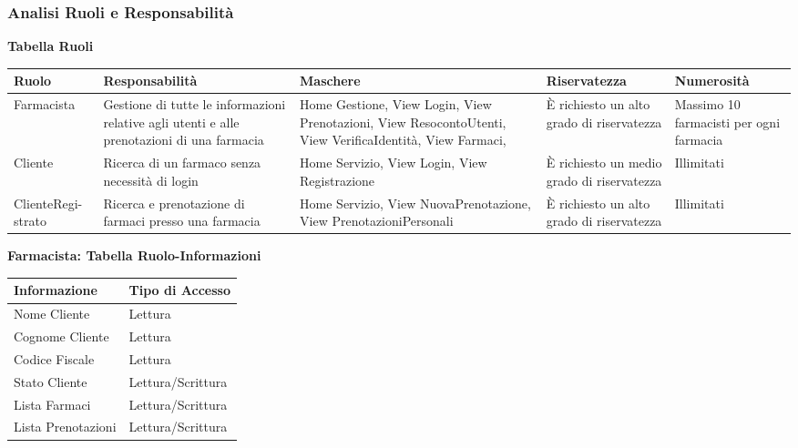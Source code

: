 \newpage
\subsubsection{Analisi Ruoli e Responsabilità}
\hfill \break

\textbf{Tabella Ruoli}
\hfill \break

\begin{tabular} {|P{2.5cm}|P{3cm}|P{3.5cm}|P{3cm}|P{3cm}|}
    \hline
    \textbf{Ruolo} & \textbf{Responsabilità} & \textbf{Maschere} & \textbf{Riservatezza} & \textbf{Numerosità} \\
    \hline
    Farmacista & Gestione di tutte le informazioni relative agli utenti e alle prenotazioni di una farmacia & Home Gestione, View Login, View Prenotazioni, View ResocontoUtenti, View VerificaIdentità, View Farmaci,  & È richiesto un alto grado di riservatezza  & Massimo 10 farmacisti per ogni farmacia \\
    \hline
    Cliente & Ricerca di un farmaco senza necessità di login & Home Servizio, View Login, View Registrazione  & È richiesto un medio grado di riservatezza & Illimitati \\
    \hline
    ClienteRegi- strato & Ricerca e prenotazione di farmaci presso una farmacia & Home Servizio, View NuovaPrenotazione, View PrenotazioniPersonali &  È richiesto un alto grado di riservatezza  & Illimitati \\
    \hline
\end{tabular}
\hfill \break
\hfill \break

\textbf{Farmacista: Tabella Ruolo-Informazioni}
\hfill \break

\begin{tabular} {|P{7cm}|P{7cm}|}
    \hline
    \textbf{Informazione} & \textbf{Tipo di Accesso} \\
    \hline
    Nome Cliente & Lettura \\
    \hline
    Cognome Cliente & Lettura \\
    \hline
    Codice Fiscale & Lettura \\
    \hline
    Stato Cliente & Lettura/Scrittura \\
    \hline
    Lista Farmaci & Lettura/Scrittura \\
    \hline
    Lista Prenotazioni & Lettura/Scrittura \\
    \hline
\end{tabular}
\hfill \break
\hfill \break

